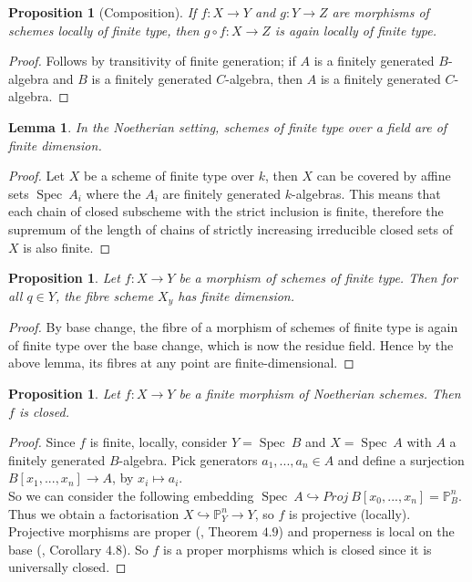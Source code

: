 \documentclass{article}
\theoremstyle{plain}
\newtheorem{proposition}[theorem]{Proposition}
\newtheorem{lemma}[theorem]{Lemma}
\theoremstyle{definition}
\DeclareMathOperator{\Spec}{Spec}
\begin{document}
\begin{proposition}[Composition]
\label{composition_locally_finite_type}
    If $f:X\rightarrow Y$ and $g:Y\rightarrow Z$ are morphisms of schemes locally of finite type, then $g\circ f :X\rightarrow Z$ is again locally of finite type.
\end{proposition}
\begin{proof}
    Follows by transitivity of finite generation;
    if $A$ is a finitely generated $B$- algebra and $B$ is a finitely generated $C$-algebra, then $A$ is a finitely generated $C$-algebra.
\end{proof}


\begin{lemma}
    In the Noetherian setting, schemes of finite type over a field are of finite dimension.
\end{lemma}
\begin{proof}
    Let $X$ be a scheme of finite type over $k$, then $X$ can be covered by affine sets $\Spec\: A_i$ where the $A_i$ are finitely generated $k$-algebras.
    This means that each chain of closed subscheme with the strict inclusion is finite, therefore the supremum of the length of chains of strictly increasing irreducible closed sets of $X$ is also finite.
\end{proof}



\begin{proposition}
    Let $f:X\rightarrow Y$ be a morphism of schemes of finite type. Then for all $q\in Y$, the fibre scheme $X_y$ has finite dimension. 
\end{proposition}
\begin{proof}
    By base change, the fibre of a morphism of schemes of finite type is again of finite type over the base change, which is now the residue field.
    Hence by the above lemma, its fibres at any point are finite-dimensional.
\end{proof}

\begin{proposition}
\label{finite_is_closed}
    Let $f:X\rightarrow Y$ be a finite morphism of Noetherian schemes. Then $f$ is closed.
\end{proposition}
\begin{proof}
    Since $f$ is finite, locally, consider 
    $Y = \Spec\:B$ and $X=\Spec\:A$ 
    with $A$ a finitely generated $B$-algebra. 
    Pick generators $a_1,...,a_n \in A$ and define a surjection $B[x_1,...,x_n] \rightarrow A$, by $x_i\mapsto a_i$.\\
    So we can consider the following embedding $\Spec\: A \hookrightarrow Proj\:B[x_0,...,x_n] = \mathbb{P}_B^n$. 
    Thus we obtain a factorisation $X\hookrightarrow \mathbb{P}_Y^n \rightarrow Y$, so $f$ is projective (locally).
    Projective morphisms are proper (\cite{Hartshorne}, Theorem $4.9$) and 
    properness is local on the base (\cite{Hartshorne}, Corollary $4.8$). So $f$ is a proper morphisms which is closed since it is universally closed. 
\end{proof}
\end{document}
